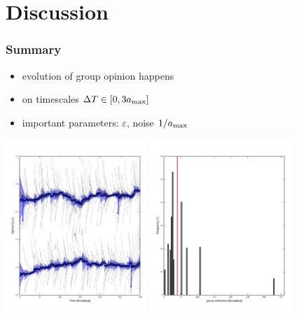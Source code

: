 \documentclass[10pt]{beamer}
\begin{document}
\section{Discussion}
\begin{frame}\frametitle{Summary}
    \begin{itemize}
        \item evolution of group opinion happens
        \item on timescales $\Delta T\in [0, 3 a_{\rm max}]$
        \item important parameters: $\varepsilon$, noise $1/a_{\rm max}$
    \end{itemize}
    \begin{center}
        \includegraphics[width=0.4\textwidth]{fig/fiducial.pdf}
        \includegraphics[width=0.4\textwidth]{fig/fiducial_var.pdf}
    \end{center}


\end{frame}
\end{document}
